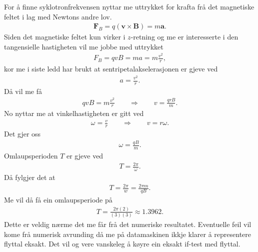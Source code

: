 \documentclass[11pt, a4paper]{article}
\begin{document}
  For å finne syklotronfrekvensen nyttar me uttrykket for krafta frå det magnetiske feltet i lag med Newtons andre lov.
  \begin{align*}
    \mathbf{F}_B = q\left( \mathbf{v} \times \mathbf{B} \right) = m\mathbf{a}.
  \end{align*}
  Siden det magnetiske feltet kun virker i $z$-retning og me er interesserte i den tangensielle hastigheten vil me jobbe med uttrykket
  \begin{align*}
    F_B = qvB = ma = m\frac{v^2}{r},
  \end{align*}
  kor me i siste ledd har brukt at sentripetalakselerasjonen er gjeve ved
  \begin{align*}
    a = \frac{v^2}{r}.
  \end{align*}
  Då vil me få
  \begin{align*}
    qvB = m\frac{v^2}{r} \qquad \Rightarrow \qquad v = \frac{qrB}{m}.
  \end{align*}
  No nyttar me at vinkelhastigheten er gitt ved 
  \begin{align*}
    \omega = \frac{v}{r} \qquad \Rightarrow \qquad v = r\omega.
  \end{align*}
  Det gjer oss
  \begin{align*}
    \omega = \frac{qB}{m}.
  \end{align*}
  Omlaupsperioden $T$ er gjeve ved 
  \begin{align*}
    T = \frac{2\pi}{\omega}.
  \end{align*}
  Då fylgjer det at
  \begin{align*}
    T = \frac{2\pi}{w} = \frac{2\pi m}{qB}.
  \end{align*}
  Me vil då få ein omlaupsperiode på 
  \begin{align*}
    T = \frac{2\pi (2)}{(3)(3)} \approx 1.3962.
  \end{align*}
  Dette er veldig nærme det me får frå det numeriske resultatet. Eventuelle feil vil kome frå numerisk avrunding då me på datamaskinen ikkje klarer å representere flyttal eksakt. Det vil 
  og vere vanskeleg å køyre ein eksakt if-test med flyttal.
\end{document}

